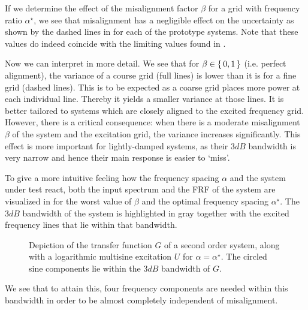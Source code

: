   If we determine the effect of the misalignment factor $\beta$ for a grid with frequency ratio $\alpha^{\star}$, we see that misalignment has a negligible effect on the uncertainty as shown by the dashed lines in  for each of the prototype systems.
  Note that these values do indeed coincide with the limiting values found in .
  
  Now we can interpret  in more detail.
  We see that for $\beta \in \set{0,1}$ (i.e. perfect alignment), the variance of a course grid (full lines) is lower than it is for a fine grid (dashed lines).
  This is to be expected as a coarse grid places more power at each individual line.
  Thereby it yields a smaller variance at those lines.
  It is better tailored to systems which are closely aligned to the excited frequency grid.
  However, there is a critical consequence: when there is a moderate misalignment $\beta$ of the system and the excitation grid, the variance increases significantly.
  This effect is more important for lightly-damped systems, as their $3\unit{dB}$ bandwidth is very narrow and hence their main response is easier to `miss'.

  To give a more intuitive feeling how the frequency spacing $\alpha$ and the system under test react, both the input spectrum and the \gls{FRF} of the system are visualized in  for the worst value of $\beta$ and the optimal frequency spacing $\alpha^{\star}$.
  The $3\unit{dB}$ bandwidth of the system is highlighted in gray together with the excited frequency lines that lie within that bandwidth.

  \begin{figure}%
    \centering
      \setlength{}
      \setlength\figureheight{0.68\figurewidth}
    
    \caption[System with highlighted bandwidth and multisine components.]{Depiction of the transfer function $G$ of a second order system, along with a logarithmic multisine excitation $U$ for $\alpha = \alpha^{\star}$. The circled sine components lie within the $3 \unit{dB}$ bandwidth of $G$.}%
    \label{fig:excitation:signalAndSystem}
  \end{figure}

  We see that to attain this, four frequency components are needed within this bandwidth in order to be almost completely independent of misalignment.

